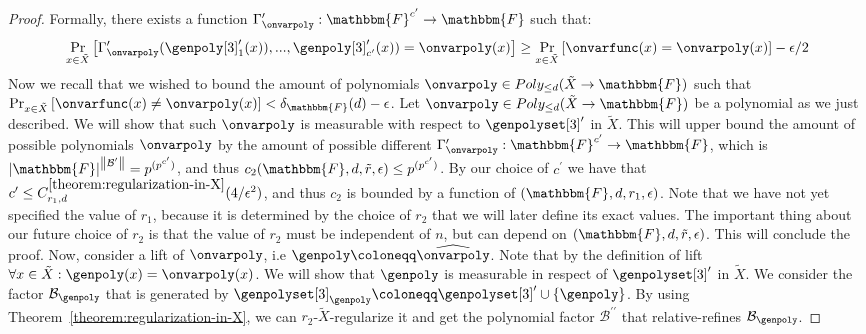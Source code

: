 \documentclass[10pt,a4paper]{article}
\newcommand{\definedas}[0]{\coloneqq}
\newcommand{\set}[1]{\left\{ #1 \right\}}
\newcommand{\basefield}[0]{\mathbbm{F}}
\newcommand{\blocklength}[0]{n}
\newcommand{\degree}[0]{d}
\newcommand{\basefieldsize}[0]{p}
\newcommand{\funcdef}[3]{#1:#2\rightarrow#3}
\newcommand{\factor}[0]{\mathcal{B}}
\newcommand{\allpolyset}[3]{Poly_{#1}(#2\rightarrow#3)}
\newcommand{\variety}{{\tilde{X}}}
\newcommand{\lift}[1]{\widehat{#1}}
\newcommand{\rankfunc}[0]{{{{r}}}}
\newcommand{\rankbiasfunc}[0]{{\tilde{r}}}
\newcommand{\norm}[1]{\left\lVert{#1}\right\rVert}
\newcommand{\abs}[1]{\left| #1 \right|}
\newcommand{\prex}[2]{\Pr_{#1}\left[ #2 \right]}
\newcommand{\normalizedcodedistance}[2]{\delta_{#1}(#2)}
\begin{document}
\begin{proof}
    Formally, there exists a function $\funcdef{\Gamma_{\onvarpoly}^\prime}{\basefield^{c^\prime}}{\basefield}$ such that:
    \[
        \prex{x \in \variety}
        {\Gamma^{\prime}_{\onvarpoly}(\genpoly[3]^{\prime}_1(x)),...,\genpoly[3]^{\prime}_{c^\prime}(x)) = \onvarpoly(x)} \geq
            \prex{x \in \variety}{\onvarfunc(x) = \onvarpoly(x)} - \epsilon / 2
    \]
    Now we recall that we wished to bound the amount of polynomials $\onvarpoly \in \allpolyset{\leq \degree}{\variety}{\basefield}$ such that
    $\prex{x \in \variety}{\onvarfunc(x) \neq \onvarpoly(x)} < \normalizedcodedistance{\basefield}{\degree} - \epsilon$.
    Let $\onvarpoly \in \allpolyset{\leq \degree}{\variety}{\basefield}$ be a polynomial as we just described.
    We will show that such $\onvarpoly$ is measurable with respect to $\genpolyset[3]^\prime$ in $\variety$.
    This will upper bound the amount of possible polynomials $\onvarpoly$ by the amount of possible different $\funcdef{\Gamma^{\prime}_{\onvarpoly}}{\basefield^{c^\prime}}{\basefield}$,
    which is $\abs{\basefield}^{\norm{\factor^\prime}} = \basefieldsize^{(\basefieldsize^{c^\prime})}$, and thus $c_2(\basefield, \degree, \rankbiasfunc, \epsilon) \leq \basefieldsize^{(\basefieldsize^{c^\prime})}$.
    \newline
    By our choice of $c^\prime$ we have that $c^\prime \leq C_{\rankfunc_1, \degree}^{\ref{theorem:regularization-in-X}}(4/\epsilon^2)$, and thus $c_2$ is bounded by a function of $(\basefield, \degree, \rankfunc_1, \epsilon)$.
    Note that we have not yet specified the value of $\rankfunc_1$, because it is determined by the choice of $\rankfunc_2$ that we will later define its exact values.
    The important thing about our future choice of $\rankfunc_2$ is that the value of $\rankfunc_2$ must be independent of $\blocklength$,
    but can depend on $(\basefield, \degree, \rankbiasfunc, \epsilon)$.
    This will conclude the proof.
    \newline
    Now, consider a lift of $\onvarpoly$, i.e $\genpoly \definedas \lift{\onvarpoly}$.
    Note that by the definition of lift $\forall x \in \variety: \genpoly(x) = \onvarpoly(x)$.
    We will show that $\genpoly$ is measurable in respect of $\genpolyset[3]^\prime$ in $\variety$.
    \newline
    We consider the factor $\factor_{\genpoly}$ that is generated by $\genpolyset[3]_{\genpoly} \definedas \genpolyset[3]^\prime \cup \set{\genpoly}$.
    By using Theorem~\ref{theorem:regularization-in-X}, we can $\rankfunc_2$-$\variety$-regularize it and get the polynomial factor $\factor^{\prime\prime}$ that relative-refines $\factor_{\genpoly}$.

\end{proof}
\end{document}
